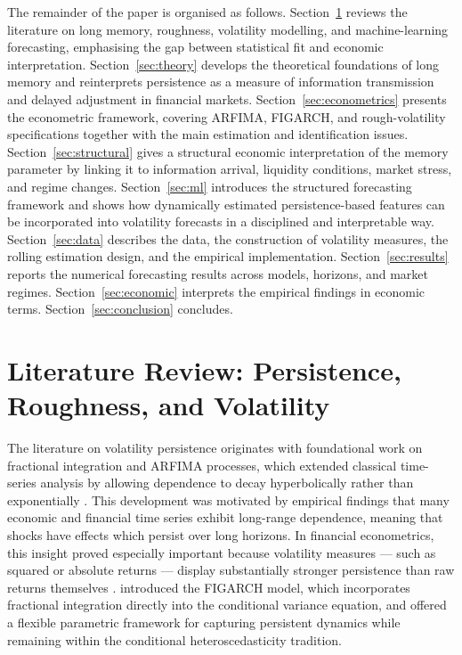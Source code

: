 \documentclass[11pt,a4paper]{article}
\begin{document}
The remainder of the paper is organised as follows.
Section~\ref{sec:literature} reviews the literature on long memory,
roughness, volatility modelling, and machine-learning forecasting,
emphasising the gap between statistical fit and economic interpretation.
Section~\ref{sec:theory} develops the theoretical foundations of long
memory and reinterprets persistence as a measure of information
transmission and delayed adjustment in financial markets.
Section~\ref{sec:econometrics} presents the econometric framework,
covering ARFIMA, FIGARCH, and rough-volatility specifications together with
the main estimation and identification issues.
Section~\ref{sec:structural} gives a structural economic interpretation of
the memory parameter by linking it to information arrival, liquidity
conditions, market stress, and regime changes.
Section~\ref{sec:ml} introduces the structured forecasting framework and shows how dynamically estimated persistence-based features can be incorporated into volatility forecasts in a disciplined and interpretable way.
Section~\ref{sec:data} describes the data, the construction of volatility
measures, the rolling estimation design, and the empirical implementation.
Section~\ref{sec:results} reports the numerical forecasting results across
models, horizons, and market regimes.
Section~\ref{sec:economic} interprets the empirical findings in economic
terms.
Section~\ref{sec:conclusion} concludes.

\section{Literature Review: Persistence, Roughness, and Volatility}
\label{sec:literature}

The literature on volatility persistence originates with foundational work
on fractional integration and ARFIMA processes, which extended classical
time-series analysis by allowing dependence to decay hyperbolically rather
than exponentially \citep{granger1980introduction,hosking1981fractional}.
This development was motivated by empirical findings that many economic
and financial time series exhibit long-range dependence, meaning that
shocks have effects which persist over long horizons. In financial
econometrics, this insight proved especially important because volatility
measures --- such as squared or absolute returns --- display substantially
stronger persistence than raw returns themselves
\citep{ding1993long}. \citet{baillie1996fractionally} introduced the
FIGARCH model, which incorporates fractional integration directly into the
conditional variance equation, and offered a flexible parametric framework
for capturing persistent dynamics while remaining within the conditional
heteroscedasticity tradition.
\end{document}
